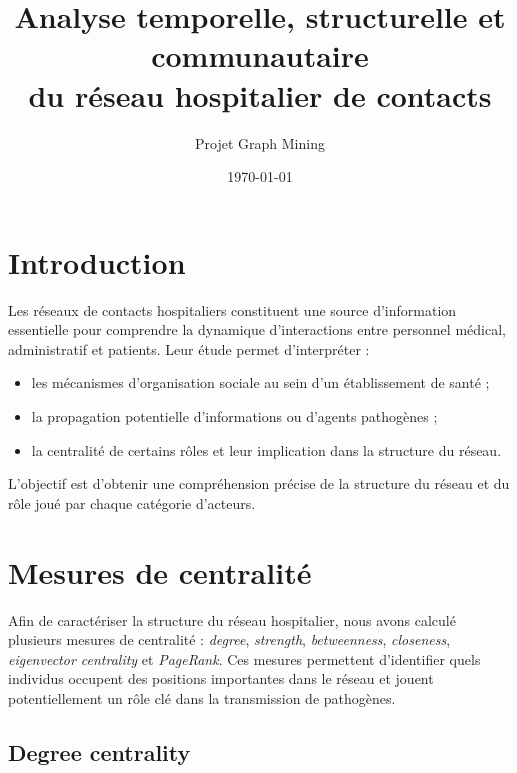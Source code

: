 \documentclass[10pt,twocolumn]{article}
\title{Analyse temporelle, structurelle et communautaire \\
du réseau hospitalier de contacts}
\author{Projet Graph Mining}
\date{\today}
\begin{document}
\maketitle

\newpage

\section{Introduction}

Les réseaux de contacts hospitaliers constituent une source d'information essentielle pour comprendre la dynamique d'interactions entre personnel médical, administratif et patients. Leur étude permet d'interpréter :

\begin{itemize}
    \item les mécanismes d'organisation sociale au sein d'un établissement de santé ;
    \item la propagation potentielle d'informations ou d'agents pathogènes ;
    \item la centralité de certains rôles et leur implication dans la structure du réseau.
\end{itemize}

L'objectif est d'obtenir une compréhension précise de la structure du réseau et du rôle joué par chaque catégorie d'acteurs.

\section{Mesures de centralité}

Afin de caractériser la structure du réseau hospitalier, nous avons calculé plusieurs mesures de centralité : \textit{degree}, \textit{strength}, \textit{betweenness}, \textit{closeness}, \textit{eigenvector centrality} et \textit{PageRank}. 
Ces mesures permettent d'identifier quels individus occupent des positions importantes dans le réseau et jouent potentiellement un rôle clé dans la transmission de pathogènes.

\subsection{Degree centrality}
\end{document}
